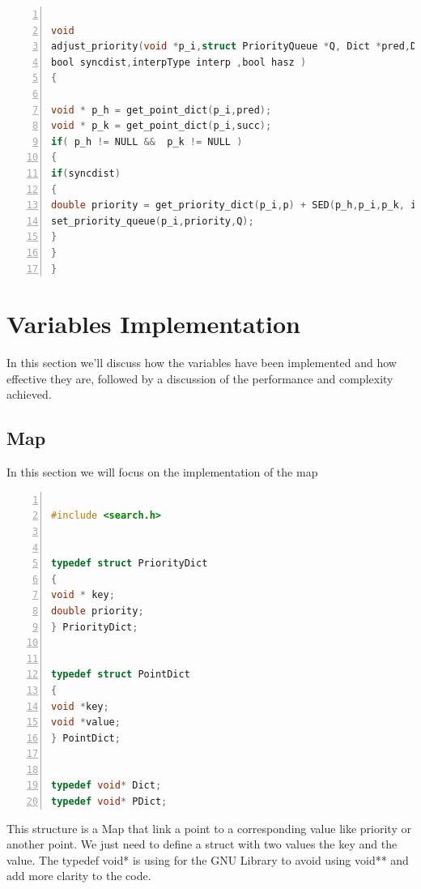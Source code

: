 \begin{lstlisting}[language=C, % Spécifie le langage du code
caption={adjust\_priority}, % Légende du listing
label=lst:adjust_c, % Étiquette pour référencer le listing
numbers=left,
numberstyle=\tiny\color{gray},
stepnumber=1,
frame=single,
breaklines=true,
postbreak=\mbox{\textcolor{red}{$\hookrightarrow$}\space},
showstringspaces=false
]

void
adjust_priority(void *p_i,struct PriorityQueue *Q, Dict *pred,Dict *succ,PDict  *p,
bool syncdist,interpType interp ,bool hasz )
{

void * p_h = get_point_dict(p_i,pred);
void * p_k = get_point_dict(p_i,succ);
if( p_h != NULL &&  p_k != NULL )
{
if(syncdist)
{
double priority = get_priority_dict(p_i,p) + SED(p_h,p_i,p_k, interp , hasz );
set_priority_queue(p_i,priority,Q);
}
}
}

\end{lstlisting}

\section{Variables Implementation}
In this section we'll discuss how the variables have been implemented and how effective they are, followed by a discussion of the performance and complexity achieved.

\subsection{Map}
In this section we will focus on the implementation of the map

\begin{lstlisting}[language=C, % Spécifie le langage du code
caption={Map C implementation}, % Légende du listing
label=lst:map_c, % Étiquette pour référencer le listing
numbers=left,
numberstyle=\tiny\color{gray},
stepnumber=1,
frame=single,
breaklines=true,
postbreak=\mbox{\textcolor{red}{$\hookrightarrow$}\space},
showstringspaces=false
]

#include <search.h>


typedef struct PriorityDict
{
void * key;
double priority;
} PriorityDict;


typedef struct PointDict
{
void *key;
void *value;
} PointDict;


typedef void* Dict;
typedef void* PDict;

\end{lstlisting}
\vspace{1cm}
This structure is a Map that link a point to a corresponding value like priority or another point. We just need to define a struct with two values the key and the value. The typedef void* is using for the GNU Library to avoid using void** and add more clarity to the code.

